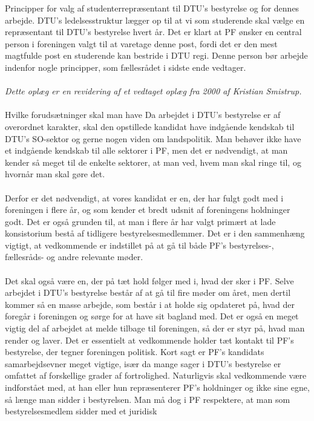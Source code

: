 Principper for valg af studenterrepræsentant til DTU’s bestyrelse og for dennes arbejde.
DTU’s ledelsesstruktur lægger op til at vi som studerende skal vælge en repræsentant til DTU’s bestyrelse hvert år. Det er klart at PF ønsker en central person i foreningen valgt til at varetage denne post, fordi det er den mest
magtfulde post en studerende kan bestride i DTU regi. Denne person bør arbejde indenfor nogle principper, som fællesrådet i sidste ende vedtager. 
\\
\\
\textit{Dette oplæg er en revidering af et vedtaget oplæg fra 2000 af Kristian Smistrup.}
\\
\\
Hvilke forudsætninger skal man have
Da arbejdet i DTU’s bestyrelse er af overordnet karakter, skal den opstillede kandidat have indgående kendskab til
DTU’s SO-sektor og gerne nogen viden om landspolitik. Man behøver ikke have et indgående kendskab til alle sektorer
i PF, men det er nødvendigt, at man kender så meget til de enkelte sektorer, at man ved, hvem man skal ringe til, og
hvornår man skal gøre det.
\\
\\
Derfor er det nødvendigt, at vores kandidat er en, der har fulgt godt med i foreningen i flere år, og som kender et bredt
udsnit af foreningens holdninger godt. Det er også grunden til, at man i flere år har valgt primært at lade konsistorium
bestå af tidligere bestyrelsesmedlemmer. Det er i den sammenhæng vigtigt, at vedkommende er indstillet på at gå til
både PF's bestyrelses-, fællesråds- og andre relevante møder.
\\
\\
Det skal også være en, der på tæt hold følger med i, hvad der sker i PF. Selve arbejdet i DTU’s bestyrelse består af at gå
til fire møder om året, men dertil kommer så en masse arbejde, som består i at holde sig opdateret på, hvad der foregår i
foreningen og sørge for at have sit bagland med. Det er også en meget vigtig del af arbejdet at melde tilbage til
foreningen, så der er styr på, hvad man render og laver. Det er essentielt at vedkommende holder tæt
kontakt til PF’s bestyrelse, der tegner foreningen politisk. Kort sagt er PF’s kandidats samarbejdsevner meget vigtige,
især da mange sager i DTU’s bestyrelse er omfattet af forskellige grader af fortrolighed.
Naturligvis skal vedkommende være indforstået med, at han eller hun repræsenterer PF’s holdninger og ikke sine egne,
så længe man sidder i bestyrelsen. Man må dog i PF respektere, at man som bestyrelsesmedlem sidder med et juridisk
